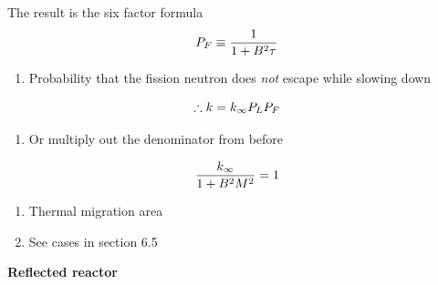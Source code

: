 \documentclass[aspectratio=1610,pdftex,dvipsnames,compress,xcolor={dvipsnames}]{beamer}
\begin{document}
\addtocounter{framenumber}{-1} 
\begin{frame}{The result is the six factor formula}
    \begin{equation}
        \LARGE
        P_F \equiv \frac{1}{1 + B^2 \tau}
    \end{equation}

    \vspace*{\fill}

    \begin{enumerate}[series=outerlist,topsep=0pt,itemsep=11pt,leftmargin=*,label=(\arabic*)]
        \item[]Probability that the fission neutron does \textit{not} escape while slowing down
    \end{enumerate}

    \vspace*{\fill}

    \begin{equation}
        \LARGE
        \therefore k = k_\infty P_L P_F
    \end{equation}

    \vspace*{\fill}

    \begin{enumerate}[series=outerlist,topsep=0pt,itemsep=11pt,leftmargin=*,label=(\arabic*)]
        \item[]Or multiply out the denominator from before
    \end{enumerate}

    \vspace*{\fill}

    \begin{equation}
        \LARGE
        \frac{k_\infty}{1 + B^2 M^2} = 1
    \end{equation}

    \vspace*{\fill}

    \begin{enumerate}[series=outerlist,topsep=0pt,itemsep=11pt,leftmargin=*,label=(\arabic*)]
        \item[]Thermal migration area
        \item[]See cases in section 6.5
    \end{enumerate}
\end{frame}


\begin{frame}[plain]{}
    \centering\LARGE\textbf{Reflected reactor}
\end{frame}
\end{document}
